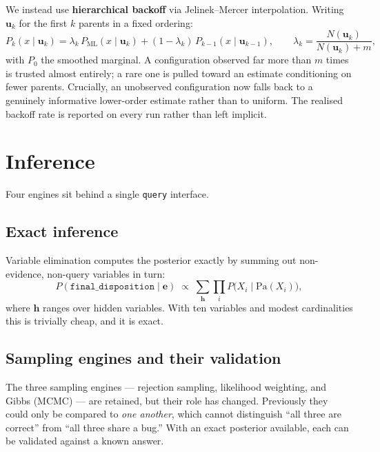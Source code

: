 \documentclass[11pt]{article}
\newcommand{\dispo}{\texttt{final\_disposition}}
\newcommand{\code}[1]{\texttt{#1}}
\begin{document}
We instead use \textbf{hierarchical backoff} via Jelinek--Mercer interpolation.
Writing $\mathbf{u}_k$ for the first $k$ parents in a fixed ordering:
\begin{equation}
  P_k(x \mid \mathbf{u}_k)
  = \lambda_k \, P_{\mathrm{ML}}(x \mid \mathbf{u}_k)
  + (1 - \lambda_k) \, P_{k-1}(x \mid \mathbf{u}_{k-1}),
  \qquad
  \lambda_k = \frac{N(\mathbf{u}_k)}{N(\mathbf{u}_k) + m},
  \label{eq:backoff}
\end{equation}
with $P_0$ the smoothed marginal. A configuration observed far more than $m$
times is trusted almost entirely; a rare one is pulled toward an estimate
conditioning on fewer parents. Crucially, an unobserved configuration now falls
back to a genuinely informative lower-order estimate rather than to uniform. The
realised backoff rate is reported on every run rather than left implicit.

\section{Inference}
\label{sec:inference}

Four engines sit behind a single \code{query} interface.

\subsection{Exact inference}

Variable elimination computes the posterior exactly by summing out non-evidence,
non-query variables in turn:
\[
  P(\dispo \mid \mathbf{e}) \;\propto\;
  \sum_{\mathbf{h}} \prod_{i} P\big(X_i \mid \mathrm{Pa}(X_i)\big),
\]
where $\mathbf{h}$ ranges over hidden variables. With ten variables and modest
cardinalities this is trivially cheap, and it is exact.

\subsection{Sampling engines and their validation}

The three sampling engines --- rejection sampling, likelihood weighting, and
Gibbs (MCMC) --- are retained, but their role has changed. Previously they could
only be compared to \emph{one another}, which cannot distinguish ``all three are
correct'' from ``all three share a bug.'' With an exact posterior available,
each can be validated against a known answer.
\end{document}
